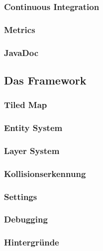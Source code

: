 		\subsubsection{Continuous Integration}		\label{sec:D4}		\clearpage
		\subsubsection{Metrics}						\label{sec:D5}		\clearpage
		\subsubsection{JavaDoc}						\label{sec:D6}		\clearpage
	\subsection{Das Framework}                      \label{sec:E0}		
		\subsubsection{Tiled Map}					\label{sec:E1}		\clearpage
		\subsubsection{Entity System}				\label{sec:E2}		\clearpage
		\subsubsection{Layer System}				\label{sec:E3}		\clearpage
		\subsubsection{Kollisionserkennung}			\label{sec:E4}		\clearpage
		\subsubsection{Settings}					\label{sec:E5}		\clearpage
		\subsubsection{Debugging}					\label{sec:E6}		\clearpage
		\subsubsection{Hintergründe}				\label{sec:E7}		\clearpage
